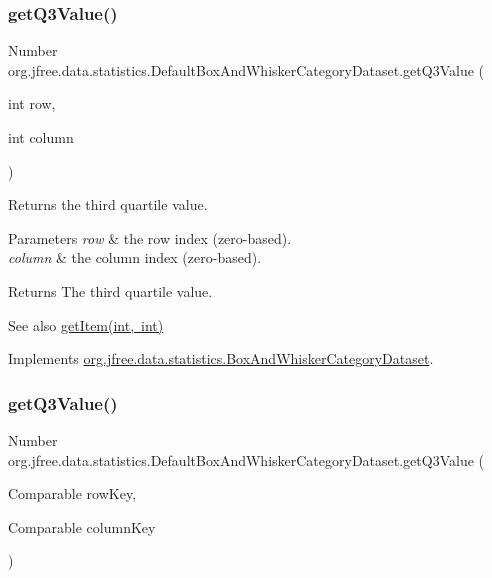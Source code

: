 \subsubsection{\texorpdfstring{get\+Q3\+Value()}{getQ3Value()}\hspace{0.1cm}{\footnotesize\ttfamily [1/2]}}
{\footnotesize\ttfamily Number org.\+jfree.\+data.\+statistics.\+Default\+Box\+And\+Whisker\+Category\+Dataset.\+get\+Q3\+Value (\begin{DoxyParamCaption}\item[{int}]{row,  }\item[{int}]{column }\end{DoxyParamCaption})}

Returns the third quartile value.


\begin{DoxyParams}{Parameters}
{\em row} & the row index (zero-\/based). \\
\hline
{\em column} & the column index (zero-\/based).\\
\hline
\end{DoxyParams}
\begin{DoxyReturn}{Returns}
The third quartile value.
\end{DoxyReturn}
\begin{DoxySeeAlso}{See also}
\mbox{\hyperlink{classorg_1_1jfree_1_1data_1_1statistics_1_1_default_box_and_whisker_category_dataset_a85c944b06e4337059ea728b3a744e2a9}{get\+Item(int, int)}} 
\end{DoxySeeAlso}


Implements \mbox{\hyperlink{interfaceorg_1_1jfree_1_1data_1_1statistics_1_1_box_and_whisker_category_dataset_a54e8f4036ef00bd3674b490096ea44a2}{org.\+jfree.\+data.\+statistics.\+Box\+And\+Whisker\+Category\+Dataset}}.

\mbox{\label{classorg_1_1jfree_1_1data_1_1statistics_1_1_default_box_and_whisker_category_dataset_acb0aafdae7cb218b7164669d19f81b96}} 
\subsubsection{\texorpdfstring{get\+Q3\+Value()}{getQ3Value()}\hspace{0.1cm}{\footnotesize\ttfamily [2/2]}}
{\footnotesize\ttfamily Number org.\+jfree.\+data.\+statistics.\+Default\+Box\+And\+Whisker\+Category\+Dataset.\+get\+Q3\+Value (\begin{DoxyParamCaption}\item[{Comparable}]{row\+Key,  }\item[{Comparable}]{column\+Key }\end{DoxyParamCaption})}

